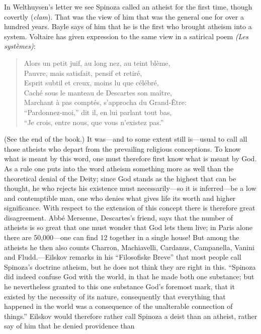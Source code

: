 \documentclass[12pt]{book}
\newcommand{\opage}[1]{\marginnote{\footnotesize\textit{[#1]}}}
\begin{document}
In Welthuysen's letter we see Spinoza called an atheist for the first time, though
covertly (\textit{clam}). That was the view of him that was the general one for over a
hundred years. Bayle says of him that he is the first \opage{56}who brought atheism into
a system. Voltaire has given expression to the same view in a satirical poem \textit{(Les
systèmes)}:

\begin{quote}
Alors un petit juif, au long nez, au teint blème,\\
Pauvre, mais satisfait, pensif et retiré,\\
Esprit subtil et creux, moins lu que célébré,\\
Caché sous le manteau de Descartes son maître,\\
Marchant à pas comptés, s'approcha du Grand-Être:\\
``Pardonnez-moi,'' dit il, en lui parlant tout bas,\\
``Je crois, entre nous, que vous n'existez pas.''
\end{quote}
\noindent (See the end of the book.) It was---and to some extent still is---usual to
call all those atheists who depart from the prevailing religious conceptions. To know
what is meant by this word, one must therefore first know what is meant by God. As a
rule one puts into the word atheism something more as well than the theoretical denial
of the Deity; since God stands as the highest that can be thought, he who rejects his
existence must necessarily---so it is inferred---be a low and contemptible man, one who
denies what gives life its worth and higher significance. With respect to the extension
of this concept there is therefore great disagreement. Abbé Mersenne, Descartes's
friend, says that the number of atheists is so great that one must wonder that God lets
them live; in Paris alone there are 50,000---one can find 12 together in a single house!
But among the atheists he then also counts Charron, Machiavelli, Cardanus, Campanella,
Vanini and Fludd.---Eilskov remarks in his ``Filosofiske Breve'' that most people call
Spinoza's doctrine atheism, but he does not think they are right in this. ``Spinoza did
indeed confuse God with the world, in that \opage{57}he made both one substance; but he
nevertheless granted to this one substance God's foremost mark, that it existed by the
necessity of its nature, consequently that everything that happened in the world was a
consequence of the unalterable connection of things.'' Eilskov would therefore rather
call Spinoza a deist than an atheist, rather say of him that he denied providence than
\end{document}
